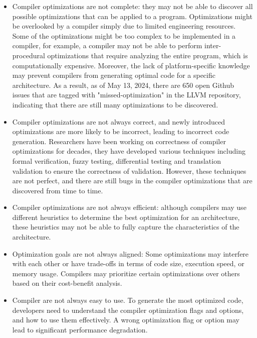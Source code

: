 \begin{itemize}

    \item Compiler optimizations are not complete: they may not be
able to discover all possible optimizations that can be applied to a
program.
%
Optimizations might be overlooked by a compiler simply due to limited
engineering resources.
%
Some of the optimizations might be too complex to be implemented in a
compiler, for example, a compiler may not be able to perform
inter-procedural optimizations that require analyzing the entire
program, which is computationally expensive.
%
Moreover, the lack of platform-specific knowledge may prevent
compilers from generating optimal code for a specific architecture.
%
As a result, as of May 13, 2024, there are 650 open Github issues
that are tagged with "missed-optimization" in the LLVM repository,
indicating that there are still many optimizations to be discovered.

\item Compiler optimizations are not always correct, and newly introduced
optimizations are more likely to be incorrect, leading to incorrect
code generation.
%
Researchers have been working on correctness of
compiler optimizations for decades, they have developed various
techniques including formal verification, fuzzy testing, differential
testing and translation validation to ensure the correctness of
validation.
%
However, these techniques are not perfect, and there are
still bugs in the compiler optimizations that are discovered from time
to time.

\item Compiler optimizations are not always efficient: although compilers
may use different heuristics to determine the best optimization for an
architecture, these heuristics may not be able to fully capture the
characteristics of the architecture.

\item Optimization goals are not always aligned: Some
optimizations may interfere with each other or have trade-offs in
terms of code size, execution speed, or memory usage. Compilers may
prioritize certain optimizations over others based on their
cost-benefit analysis.

\item Compiler are not always easy to use. To generate the most
optimized code, developers need to understand the compiler
optimization flags and options, and how to use them effectively.
A wrong optimization flag or option may lead to significant performance
degradation.

\end{itemize}











